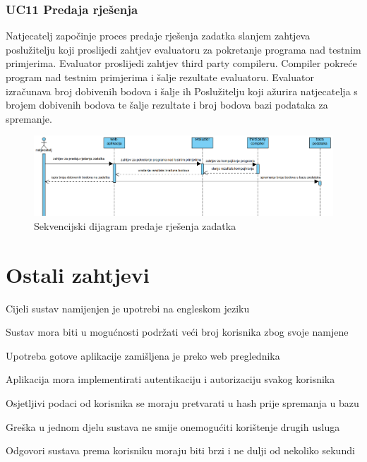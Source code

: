 				
				\clearpage 
				
				\subsubsection*{UC11 Predaja rješenja}
				
				Natjecatelj započinje proces predaje rješenja zadatka slanjem zahtjeva poslužitelju koji proslijedi zahtjev evaluatoru za pokretanje programa nad testnim primjerima. Evaluator proslijedi zahtjev third party compileru. Compiler pokreće program nad testnim primjerima i šalje rezultate evaluatoru. Evaluator izračunava broj dobivenih bodova i šalje ih Poslužitelju koji ažurira natjecatelja s brojem dobivenih bodova te šalje rezultate i broj bodova bazi podataka za spremanje.
				\vspace{20mm}

				\begin{figure}[htbp]
					\centering
					\includegraphics[width=\linewidth]{slike/predaja_rjesenja_zadatka.png}
					\caption{Sekvencijski dijagram predaje rješenja zadatka}\label{fig:seqdiag_rjesenja}
				\end{figure}


			\eject 
	
		\section{Ostali zahtjevi}
		
			\begin{packed_item}
				\item Cijeli sustav namijenjen je upotrebi na engleskom jeziku
				\item Sustav mora biti u mogućnosti podržati veći broj korisnika zbog svoje namjene
				\item Upotreba gotove aplikacije zamišljena je preko web preglednika
				\item Aplikacija mora implementirati autentikaciju i autorizaciju svakog korisnika
				\item Osjetljivi podaci od korisnika se moraju pretvarati u hash prije spremanja u bazu
				\item Greška u jednom djelu sustava ne smije onemogućiti korištenje drugih usluga
				\item Odgovori sustava prema korisniku moraju biti brzi i ne dulji od nekoliko sekundi
			\end{packed_item}
			 
			 
			 
	